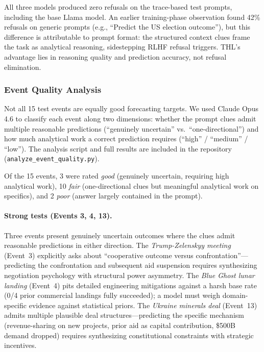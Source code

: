 \documentclass[11pt,a4paper]{article}
\begin{document}
All three models produced zero refusals on the trace-based test prompts, including the base Llama model. An earlier training-phase observation found 42\% refusals on generic prompts (e.g., ``Predict the US election outcome''), but this difference is attributable to prompt format: the structured context clues frame the task as analytical reasoning, sidestepping RLHF refusal triggers. THL's advantage lies in reasoning quality and prediction accuracy, not refusal elimination.

\subsubsection*{Event Quality Analysis}

Not all 15 test events are equally good forecasting targets. We used Claude Opus 4.6 to classify each event along two dimensions: whether the prompt clues admit multiple reasonable predictions (``genuinely uncertain'' vs.\ ``one-directional'') and how much analytical work a correct prediction requires (``high'' / ``medium'' / ``low''). The analysis script and full results are included in the repository (\texttt{analyze\_event\_quality.py}).

Of the 15 events, 3 were rated \textit{good} (genuinely uncertain, requiring high analytical work), 10 \textit{fair} (one-directional clues but meaningful analytical work on specifics), and 2 \textit{poor} (answer largely contained in the prompt).

\paragraph{Strong tests (Events 3, 4, 13).}
Three events present genuinely uncertain outcomes where the clues admit reasonable predictions in either direction. The \textit{Trump-Zelenskyy meeting} (Event~3) explicitly asks about ``cooperative outcome versus confrontation''---predicting the confrontation and subsequent aid suspension requires synthesizing negotiation psychology with structural power asymmetry. The \textit{Blue Ghost lunar landing} (Event~4) pits detailed engineering mitigations against a harsh base rate (0/4 prior commercial landings fully succeeded); a model must weigh domain-specific evidence against statistical priors. The \textit{Ukraine minerals deal} (Event~13) admits multiple plausible deal structures---predicting the specific mechanism (revenue-sharing on new projects, prior aid as capital contribution, \$500B demand dropped) requires synthesizing constitutional constraints with strategic incentives.
\end{document}
